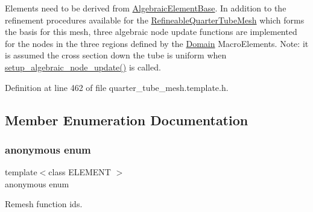 Elements need to be derived from \hyperlink{classoomph_1_1AlgebraicElementBase}{Algebraic\+Element\+Base}. In addition to the refinement procedures available for the \hyperlink{classoomph_1_1RefineableQuarterTubeMesh}{Refineable\+Quarter\+Tube\+Mesh} which forms the basis for this mesh, three algebraic node update functions are implemented for the nodes in the three regions defined by the \hyperlink{classoomph_1_1Domain}{Domain} Macro\+Elements. Note\+: it is assumed the cross section down the tube is uniform when \hyperlink{classoomph_1_1AlgebraicRefineableQuarterTubeMesh_a2d0312615834a2aec8d0d6d4e2c846ef}{setup\+\_\+algebraic\+\_\+node\+\_\+update()} is called. 

Definition at line 462 of file quarter\+\_\+tube\+\_\+mesh.\+template.\+h.



\subsection{Member Enumeration Documentation}
\mbox{\label{classoomph_1_1AlgebraicRefineableQuarterTubeMesh_a215c0430765f10553590b0d47203393d}} 
\subsubsection{\texorpdfstring{anonymous enum}{anonymous enum}}
{\footnotesize\ttfamily template$<$class E\+L\+E\+M\+E\+NT $>$ \\
anonymous enum\hspace{0.3cm}{\ttfamily [private]}}



Remesh function ids. 

